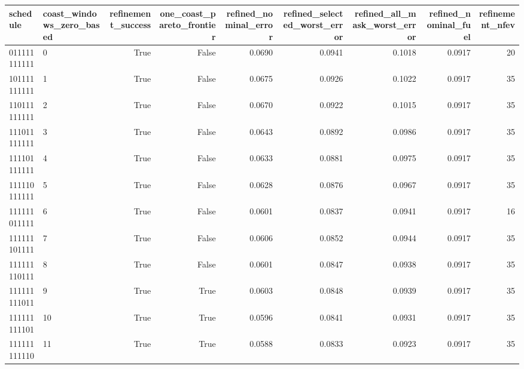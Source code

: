 \begin{tabular}{llrrrrrrr}
\toprule
schedule & coast\_windows\_zero\_based & refinement\_success & one\_coast\_pareto\_frontier & refined\_nominal\_error & refined\_selected\_worst\_error & refined\_all\_mask\_worst\_error & refined\_nominal\_fuel & refinement\_nfev \\
\midrule
011111111111 & 0 & True & False & 0.0690 & 0.0941 & 0.1018 & 0.0917 & 20 \\
101111111111 & 1 & True & False & 0.0675 & 0.0926 & 0.1022 & 0.0917 & 35 \\
110111111111 & 2 & True & False & 0.0670 & 0.0922 & 0.1015 & 0.0917 & 35 \\
111011111111 & 3 & True & False & 0.0643 & 0.0892 & 0.0986 & 0.0917 & 35 \\
111101111111 & 4 & True & False & 0.0633 & 0.0881 & 0.0975 & 0.0917 & 35 \\
111110111111 & 5 & True & False & 0.0628 & 0.0876 & 0.0967 & 0.0917 & 35 \\
111111011111 & 6 & True & False & 0.0601 & 0.0837 & 0.0941 & 0.0917 & 16 \\
111111101111 & 7 & True & False & 0.0606 & 0.0852 & 0.0944 & 0.0917 & 35 \\
111111110111 & 8 & True & False & 0.0601 & 0.0847 & 0.0938 & 0.0917 & 35 \\
111111111011 & 9 & True & True & 0.0603 & 0.0848 & 0.0939 & 0.0917 & 35 \\
111111111101 & 10 & True & True & 0.0596 & 0.0841 & 0.0931 & 0.0917 & 35 \\
111111111110 & 11 & True & True & 0.0588 & 0.0833 & 0.0923 & 0.0917 & 35 \\
\bottomrule
\end{tabular}
